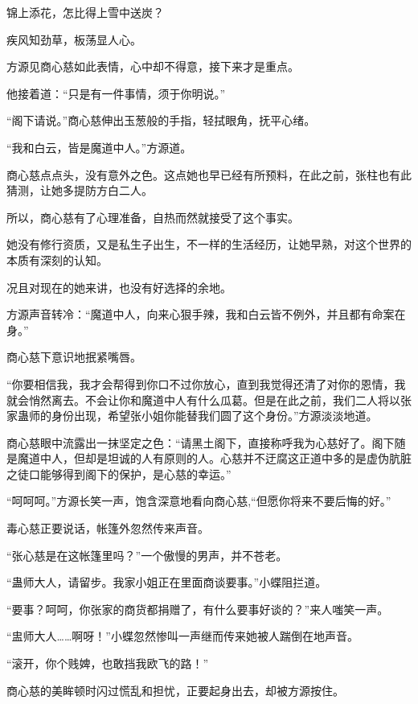 
\begin{this_body}

锦上添花，怎比得上雪中送炭？

疾风知劲草，板荡显人心。

方源见商心慈如此表情，心中却不得意，接下来才是重点。

他接着道：“只是有一件事情，须于你明说。”

“阁下请说。”商心慈伸出玉葱般的手指，轻拭眼角，抚平心绪。

“我和白云，皆是魔道中人。”方源道。

商心慈点点头，没有意外之色。这点她也早已经有所预料，在此之前，张柱也有此猜测，让她多提防方白二人。

所以，商心慈有了心理准备，自热而然就接受了这个事实。

她没有修行资质，又是私生子出生，不一样的生活经历，让她早熟，对这个世界的本质有深刻的认知。

况且对现在的她来讲，也没有好选择的余地。

方源声音转冷：“魔道中人，向来心狠手辣，我和白云皆不例外，并且都有命案在身。”

商心慈下意识地抿紧嘴唇。

“你要相信我，我才会帮得到你口不过你放心，直到我觉得还清了对你的恩情，我就会悄然离去。不会让你和魔道中人有什么瓜葛。但是在此之前，我们二人将以张家蛊师的身份出现，希望张小姐你能替我们圆了这个身份。”方源淡淡地道。

商心慈眼中流露出一抹坚定之色：“请黑土阁下，直接称呼我为心慈好了。阁下随是魔道中人，但却是坦诚的人有原则的人。心慈并不迂腐这正道中多的是虚伪肮脏之徒口能够得到阁下的保护，是心慈的幸运。”

“呵呵呵。”方源长笑一声，饱含深意地看向商心慈,“但愿你将来不要后悔的好。”

毒心慈正要说话，帐篷外忽然传来声音。

“张心慈是在这帐篷里吗？”一个傲慢的男声，并不苍老。

“蛊师大人，请留步。我家小姐正在里面商谈要事。”小蝶阻拦道。

“要事？呵呵，你张家的商货都捐赠了，有什么要事好谈的？”来人嗤笑一声。

“盅师大人……啊呀！”小蝶忽然惨叫一声继而传来她被人踹倒在地声音。

“滚开，你个贱婢，也敢挡我欧飞的路！”

商心慈的美眸顿时闪过慌乱和担忧，正要起身出去，却被方源按住。


\end{this_body}
